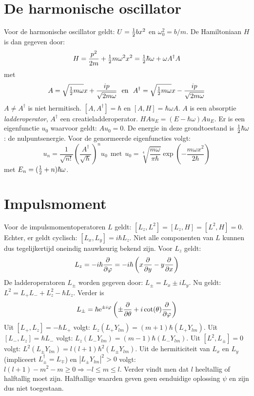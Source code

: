 \section[~~De harmonische oscillator]{De harmonische oscillator}
Voor de harmonische oscillator geldt: $U=\mbox{$\frac{1}{2}$} bx^2$ en $\omega_0^2=b/m$. De
Hamiltoniaan $H$ is dan gegeven door:
\[
H=\frac{p^2}{2m}+\mbox{$\frac{1}{2}$} m\omega^2 x^2=\mbox{$\frac{1}{2}$}\hbar\omega+\omega A^\dagger A
\]
met
\[
A=\sqrt{\mbox{$\frac{1}{2}$} m\omega}x+\frac{ip}{\sqrt{2m\omega}}~~\mbox{en}~~
A^\dagger=\sqrt{\mbox{$\frac{1}{2}$} m\omega}x-\frac{ip}{\sqrt{2m\omega}}
\]
$A\neq A^\dagger$ is niet hermitisch. $[A,A^\dagger]=\hbar$ en
$[A,H]=\hbar\omega A$. $A$ is een absorptie {\it ladderoperator}, $A^\dagger$
een creatieladderoperator. $HAu_E=(E-\hbar\omega)Au_E$. Er is een
eigenfunctie $u_0$ waarvoor geldt: $Au_0=0$. De energie in deze grondtoestand
is $\mbox{$\frac{1}{2}$}\hbar\omega$: de nulpuntsenergie. Voor de genormeerde eigenfuncties
volgt:
\[
u_n=\frac{1}{\sqrt{n!}}\left(\frac{A^\dagger}{\sqrt{\hbar}}\right)^nu_0~~\mbox{met}~~
u_0=\sqrt[4]{\frac{m\omega}{\pi\hbar}}\exp\left(-\frac{m\omega x^2}{2\hbar}\right)
\]
met $E_n=(\mbox{$\frac{1}{2}$}+n)\hbar\omega$.

\section[~~Impulsmoment]{Impulsmoment}
Voor de impulsmomentoperatoren $L$ geldt: $[L_z,L^2]=[L_z,H]=[L^2,H]=0$.
Echter, er geldt cyclisch: $[L_x,L_y]=i\hbar L_z$. Niet alle componenten van
$L$ kunnen dus tegelijkertijd oneindig nauwkeurig bekend zijn. Voor $L_z$
geldt:
\[
L_z=-i\hbar\frac{\partial }{\partial \varphi}=-i\hbar\left(x\frac{\partial }{\partial y}-y\frac{\partial }{\partial x}\right)
\]
De ladderoperatoren $L_\pm$ worden gegeven door: $L_\pm=L_x\pm iL_y$. Nu
geldt: $L^2=L_+L_-+L_z^2-\hbar L_z$. Verder is
\[
L_\pm=\hbar{\rm e}^{\pm i\varphi}\left(\pm\frac{\partial }{\partial \theta}+i\cot(\theta)\frac{\partial }{\partial \varphi}\right)
\]
Uit $[L_+,L_z]=-\hbar L_+$ volgt: $L_z(L_+Y_{lm})=(m+1)\hbar(L_+Y_{lm})$.
\npar
Uit $[L_-,L_z]=\hbar L_-$ volgt: $L_z(L_-Y_{lm})=(m-1)\hbar(L_-Y_{lm})$.
\npar
Uit $[L^2,L_\pm]=0$ volgt: $L^2(L_\pm Y_{lm})=l(l+1)\hbar^2(L_\pm Y_{lm})$.
\npar
Uit de hermiticiteit van $L_x$ en $L_y$ (impliceert $L_\pm^\dagger=L_\mp$) en
$|L_\pm Y_{lm}|^2>0$ volgt: $l(l+1)-m^2-m\geq0\Rightarrow-l\leq m\leq l$.
Verder vindt men dat $l$ heeltallig of halftallig moet zijn. Halftallige
waarden geven geen eenduidige oplossing $\psi$ en zijn dus niet toegestaan.

